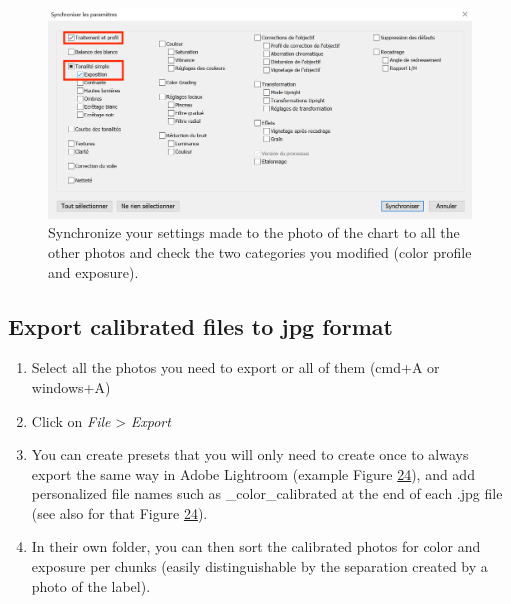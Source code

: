 \documentclass[
]{book}
\theoremstyle{definition}
\theoremstyle{definition}
\theoremstyle{definition}
\theoremstyle{definition}
\theoremstyle{remark}
\begin{document}
\begin{figure}
\hypertarget{fig:synchronize}{%
\centering
\includegraphics{Figures/synchronize_capture.png}
\caption{Synchronize your settings made to the photo of the chart to all the
other photos and check the two categories you modified (color profile
and exposure).}\label{fig:synchronize}
}
\end{figure}

\hypertarget{export-calibrated-files-to-jpg-format}{%
\subsection{Export calibrated files to jpg format}\label{export-calibrated-files-to-jpg-format}}

\begin{enumerate}
\def\labelenumi{\arabic{enumi}.}
\item
  Select all the photos you need to export or all of them (cmd+A or
  windows+A)
\item
  Click on \emph{File} \textgreater{} \emph{Export}
\item
  You can create presets that you will only need to create once to
  always export the same way in Adobe Lightroom (example Figure
  \protect\hyperlink{export_parameters}{24}), and add personalized file names
  such as \_color\_calibrated at the end of each .jpg file (see also
  for that Figure \protect\hyperlink{export_parameters}{24}).
\item
  In their own folder, you can then sort the calibrated photos for
  color and exposure per chunks (easily distinguishable by the
  separation created by a photo of the label).
\end{enumerate}
\end{document}
